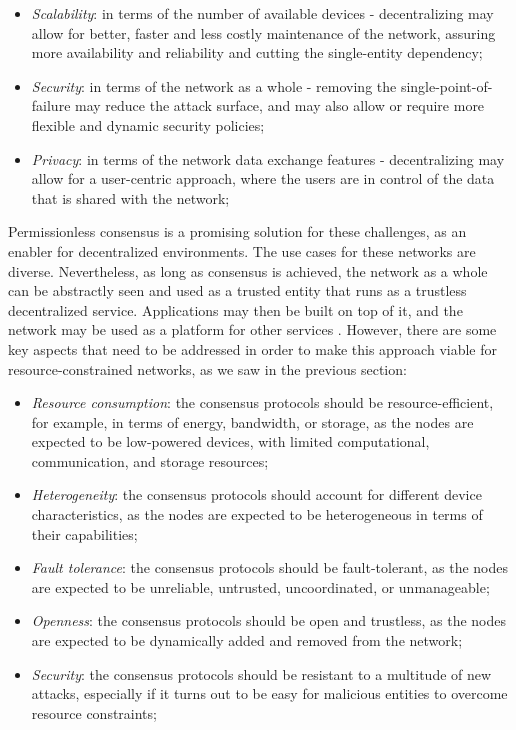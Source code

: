 \documentclass[journal]{IEEEtran}
\begin{document}
\begin{itemize}
  \item \emph{Scalability}:  in terms of the number of available devices - decentralizing may allow
  for better, faster and less costly maintenance of the network, assuring more availability and reliability
  and cutting the single-entity dependency;
  \item \emph{Security}: in terms of the network as a whole - removing the single-point-of-failure 
  may reduce the attack surface, and may also allow or require more flexible and dynamic security policies;
  \item \emph{Privacy}: in terms of the network data exchange features - decentralizing may allow for
  a user-centric approach, where the users are in control of the data that is shared with the network; 
\end{itemize}

Permissionless consensus is a promising solution for these challenges, as an enabler for
decentralized environments. The use cases for these networks are diverse. Nevertheless,
as long as consensus is achieved, the network as a whole can be abstractly seen and used
as a trusted entity that runs as a trustless decentralized service. Applications may then
be built on top of it, and the network may be used as a platform for other services \cite{queralta2021blockchain}.
However, there are some key aspects that need to be addressed
in order to make this approach viable for resource-constrained networks, as we saw in the previous section:

\begin{itemize}
  \item \emph{Resource consumption}: the consensus protocols should be resource-efficient, for example, in terms of energy, bandwidth, or storage, 
  as the nodes are expected to be low-powered devices, with limited computational, communication, and storage resources;
  \item \emph{Heterogeneity}: the consensus protocols should account for different device characteristics, 
  as the nodes are expected to be heterogeneous in terms of their capabilities;
  \item \emph{Fault tolerance}: the consensus protocols should be fault-tolerant, as the nodes are expected to be unreliable, 
  untrusted, uncoordinated, or unmanageable;
  \item \emph{Openness}: the consensus protocols should be open and trustless, as the nodes are expected to be 
  dynamically added and removed from the network;
  \item \emph{Security}: the consensus protocols should be resistant to a multitude of new attacks,
   especially if it turns out to be easy for malicious entities to overcome resource constraints;
\end{itemize}
\end{document}
